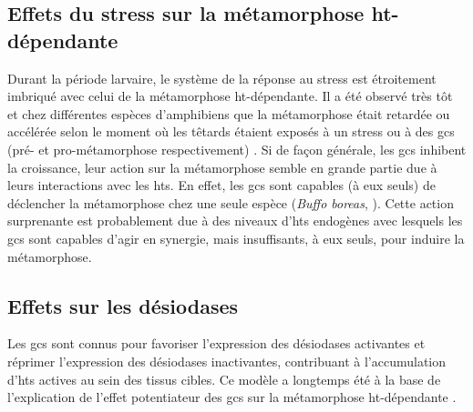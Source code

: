 \documentclass[../main.tex]{subfiles}
\begin{document}


\subsection{Effets du stress sur la métamorphose \gls{ht}-dépendante}
Durant la période larvaire, le système de la réponse au stress est étroitement imbriqué avec celui de la métamorphose \gls{ht}-dépendante.
Il a été observé très tôt et chez différentes espèces d'amphibiens que la métamorphose était retardée ou accélérée selon le moment où les têtards étaient exposés à un stress ou à des \glspl{gc} (pré- et pro-métamorphose respectivement) \citep{Kobayashi1958,Kikuyama1983}.
Si de façon générale, les \glspl{gc} inhibent la croissance, leur action sur la métamorphose semble en grande partie due à leurs interactions avec les \glspl{ht}.
En effet, les \glspl{gc} sont capables (à eux seuls) de déclencher la métamorphose chez une seule espèce (\textit{Buffo boreas}, \citealp{Hayes1993a}).
Cette action surprenante est probablement due à des niveaux d'\glspl{ht} endogènes avec lesquels les \glspl{gc} sont capables d'agir en synergie, mais insuffisants, à eux seuls, pour induire la métamorphose.

\subsection{Effets sur les désiodases}
Les \glspl{gc} sont connus pour favoriser l'expression des désiodases activantes et réprimer l'expression des désiodases inactivantes, contribuant à l'accumulation d'\glspl{ht} actives au sein des tissus cibles.
Ce modèle a longtemps été à la base de l'explication de l'effet potentiateur des \glspl{gc} sur la métamorphose \gls{ht}-dépendante \citep{Galton1990}.
\end{document}
